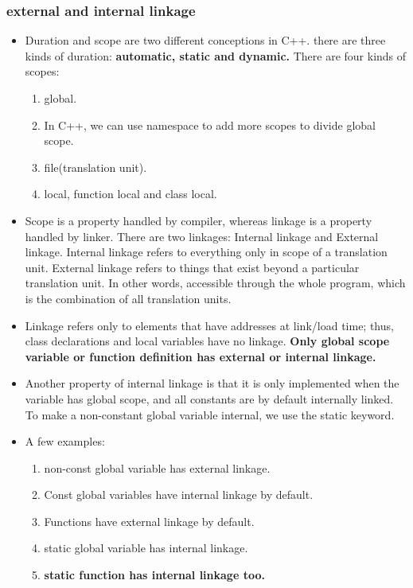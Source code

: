 \documentclass[a4paper,11pt,twoside]{book}
\begin{document}
\subsubsection{external and internal linkage}
\begin{itemize}
	\item Duration and scope are two different conceptions in C++. there are three kinds of duration: \textbf{automatic, static and dynamic.} There are four kinds of scopes:
	\begin{enumerate}
		\item global.
		\item In C++, we can use namespace to add more scopes to divide global scope.
		\item file(translation unit).
		\item local, function local and class local. 
	\end{enumerate}

	\item Scope is a property handled by compiler, whereas linkage is a property handled by linker. There are two linkages: Internal linkage and External linkage. Internal linkage refers to everything only in scope of a translation unit. External linkage refers to things that exist beyond a particular translation unit. In other words, accessible through the whole program, which is the combination of all translation units.
	
	\item Linkage refers only to elements that have addresses at link/load time; thus, class declarations and local variables have no linkage. \textbf{Only global scope variable or function definition has external or internal linkage. }
	
	\item Another property of internal linkage is that it is only implemented when the variable has global scope, and all constants are by default internally linked. To make a non-constant global variable internal, we use the static keyword.
	
	\item A few examples:
\begin{enumerate}
	\item non-const global variable has external linkage.
	\item Const global variables have internal linkage by default.
	\item Functions have external linkage by default.
	\item static global variable has internal linkage.
	\item \textbf{static function has internal linkage too.}
\end{enumerate}


\end{itemize}
\end{document}
